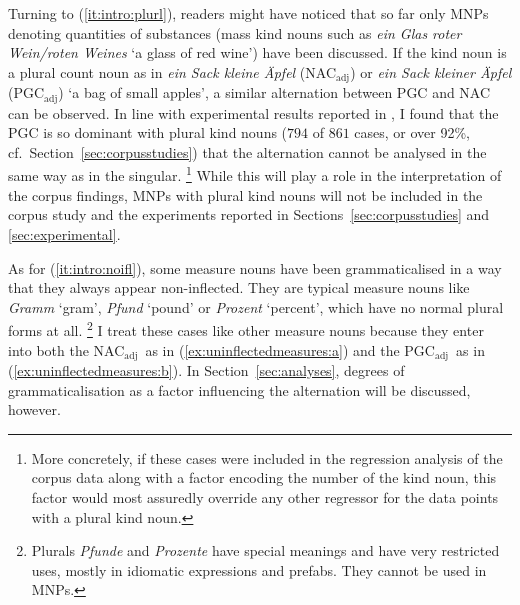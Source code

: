 \documentclass[USenglish]{article}
\newcommand{\Sub}[1]{\ensuremath{\mathrm{_{#1}}}}
\newcommand{\NACa}{NAC\Sub{adj}}
\newcommand{\PGCa}{PGC\Sub{adj}}
\begin{document}
Turning to (\ref{it:intro:plurl}), readers might have noticed that so far only MNPs denoting quantities of substances (mass kind nouns such as \textit{ein Glas roter Wein\slash roten Weines} `a glass of red wine') have been discussed.
If the kind noun is a plural count noun as in \textit{ein Sack kleine Äpfel} (\NACa) or \textit{ein Sack kleiner Äpfel} (\PGCa) `a bag of small apples', a similar alternation between PGC and NAC can be observed.
In line with experimental results reported in \citet[15--16]{Zimmer2015}, I found that the PGC is so dominant with plural kind nouns ($794$ of $861$ cases, or over 92\%, cf.\ Section~\ref{sec:corpusstudies}) that the alternation cannot be analysed in the same way as in the singular.%
\footnote{More concretely, if these cases were included in the regression analysis of the corpus data along with a factor encoding the number of the kind noun, this factor would most assuredly override any other regressor for the data points with a plural kind noun.}
While this will play a role in the interpretation of the corpus findings, MNPs with plural kind nouns will not be included in the corpus study and the experiments reported in Sections~\ref{sec:corpusstudies} and \ref{sec:experimental}.

As for (\ref{it:intro:noifl}), some measure nouns have been grammaticalised in a way that they always appear non-inflected.
They are typical measure nouns like \textit{Gramm} `gram', \textit{Pfund} `pound' or \textit{Prozent} `percent', which have no normal plural forms at all.%
\footnote{Plurals \textit{Pfunde} and \textit{Prozente} have special meanings and have very restricted uses, mostly in idiomatic expressions and prefabs.
They cannot be used in MNPs.}
I treat these cases like other measure nouns because they enter into both the \NACa\ as in (\ref{ex:uninflectedmeasures:a}) and the \PGCa\ as in (\ref{ex:uninflectedmeasures:b}).
In Section~\ref{sec:analyses}, degrees of grammaticalisation as a factor influencing the alternation will be discussed, however. 

\begin{exe}
  \ex\label{ex:uninflectedmeasures}
  \begin{xlist}
  \end{xlist}
\end{exe}
\end{document}
